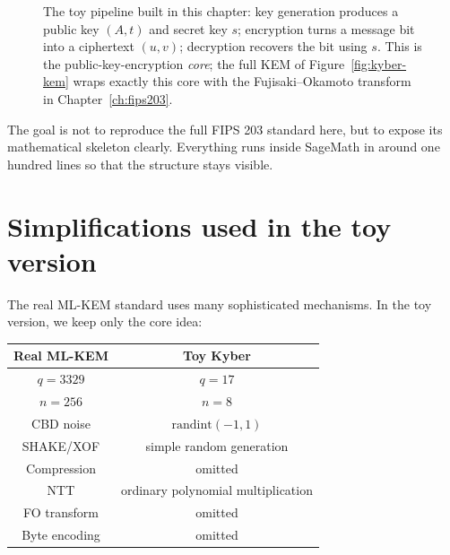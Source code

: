 \begin{figure}[H]
\centering
{}
\caption{The toy pipeline built in this chapter: key generation produces a public key $(A,t)$ and secret key $s$; encryption turns a message bit into a ciphertext $(u,v)$; decryption recovers the bit using $s$. This is the public-key-encryption \emph{core}; the full KEM of Figure~\ref{fig:kyber-kem} wraps exactly this core with the Fujisaki--Okamoto transform in Chapter~\ref{ch:fips203}.}
\label{fig:toy-mlkem-pipeline}
\end{figure}

The goal is not to reproduce the full FIPS 203 standard here, but to expose its mathematical skeleton clearly. Everything runs inside SageMath in around one hundred lines so that the structure stays visible.

\section{Simplifications used in the toy version}

The real ML-KEM standard uses many sophisticated mechanisms. In the toy version, we keep only the core idea:

\begin{table}[H]
\centering
\begin{tabular}{|c|c|}
\hline
Real ML-KEM & Toy Kyber \\
\hline
$q=3329$ & $q=17$ \\
\hline
$n=256$ & $n=8$ \\
\hline
CBD noise & $\text{randint}(-1,1)$ \\
\hline
SHAKE/XOF & simple random generation \\
\hline
Compression & omitted \\
\hline
NTT & ordinary polynomial multiplication \\
\hline
FO transform & omitted \\
\hline
Byte encoding & omitted \\
\hline
\end{tabular}
\end{table}


